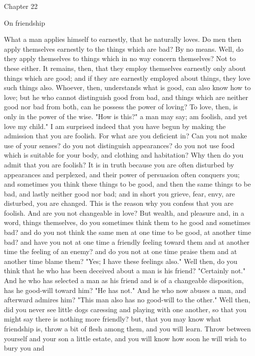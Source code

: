 \documentclass[a4paper]{article}
\begin{document}
Chapter 22

On friendship

    What a man applies himself to earnestly, that he naturally loves. Do men
then apply themselves earnestly to the things which are bad? By no means. Well,
do they apply themselves to things which in no way concern themselves? Not to
these either. It remains, then, that they employ themselves earnestly only
about things which are good; and if they are earnestly employed about things,
they love such things also. Whoever, then, understands what is good, can also
know how to love; but he who cannot distinguish good from bad, and things which
are neither good nor bad from both, can he possess the power of loving? To
love, then, is only in the power of the wise.
    "How is this?" a man may say; am foolish, and yet love my child." I am
surprised indeed that you have begun by making the admission that you are
foolish. For what are you deficient in? Can you not make use of your senses? do
you not distinguish appearances? do you not use food which is suitable for your
body, and clothing and habitation? Why then do you admit that you are foolish?
It is in truth because you are often disturbed by appearances and perplexed,
and their power of persuasion often conquers you; and sometimes you think these
things to be good, and then the same things to be bad, and lastly neither good
nor bad; and in short you grieve, fear, envy, are disturbed, you are changed.
This is the reason why you confess that you are foolish. And are you not
changeable in love? But wealth, and pleasure and, in a word, things themselves,
do you sometimes think them to he good and sometimes bad? and do you not think
the same men at one time to be good, at another time bad? and have you not at
one time a friendly feeling toward them and at another time the feeling of an
enemy? and do you not at one time praise them and at another time blame them?
"Yes; I have these feelings also." Well then, do you think that he who has been
deceived about a man is his friend? "Certainly not." And he who has selected a
man as his friend and is of a changeable disposition, has he good-will toward
him? "He has not." And he who now abuses a man, and afterward admires him?
"This man also has no good-will to the other." Well then, did you never see
little dogs caressing and playing with one another, so that you might say there
is nothing more friendly? but, that you may know what friendship is, throw a
bit of flesh among them, and you will learn. Throw between yourself and your
son a little estate, and you will know how soon he will wish to bury you and
\end{document}
